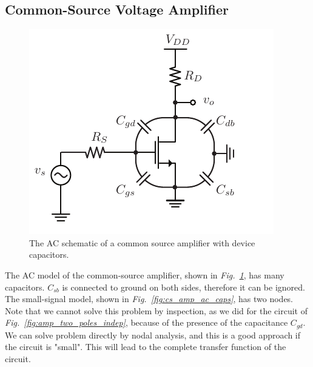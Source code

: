 \subsection{Common-Source Voltage Amplifier}
\begin{figure}[tb]
\centering
\includegraphics[scale=1]{cs_amp_caps}
\caption{The AC schematic of a common source amplifier with device capacitors.} \label{fig:cs_amp_caps}
\end{figure}
The AC model of the common-source amplifier, shown in \emph{Fig.~\ref{fig:cs_amp_caps}}, has many capacitors.  
 $C_{sb}$ is connected to ground on both sides, therefore it can be ignored.  The small-signal model, shown in \emph{Fig.~\ref{fig:cs_amp_ac_caps}}, has two nodes.  Note that we cannot solve this problem by inspection, as we did for the circuit of \emph{Fig.~\ref{fig:amp_two_poles_indep}}, because of the presence of the capacitance $C_{gd}$. We can solve problem directly by nodal analysis, and this is a good approach if the circuit is "small".  This will lead to the complete transfer function of the circuit.
